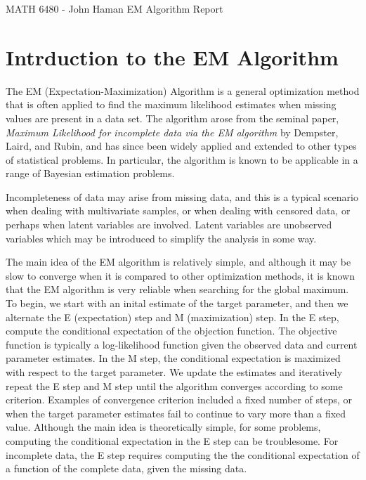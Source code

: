 \documentclass[12pt]{article}
\newcommand{\CourseName}{\textsf{MATH 6480 - John Haman }}
\begin{document}
\medskip
\begin{flushleft}
  \CourseName \hfill \textsf{EM Algorithm Report}\\
\medskip

\section{Intrduction to the EM Algorithm}

\par


The EM (Expectation-Maximization) Algorithm is a general optimization method that is often applied to find the maximum likelihood estimates when missing values are present in a data set. The algorithm arose from the seminal paper, \textit{Maximum Likelihood for incomplete data via the EM algorithm} by Dempster, Laird, and Rubin, and has since been widely applied and extended to other types of statistical problems. In particular, the algorithm is known to be applicable in a range of Bayesian estimation problems. 

\medskip

\par

Incompleteness of data may arise from missing data, and this is a typical scenario when dealing with multivariate samples, or when dealing with censored data, or perhaps when latent variables are involved. Latent variables are unobserved variables which may be introduced to simplify the analysis in some way. \\

\medskip

\par

The main idea of the EM algorithm is relatively simple, and although it may be slow to converge when it is compared to other optimization methods, it is known that the EM algorithm is very reliable when searching for the global maximum. To begin, we start with an inital estimate of the target parameter, and then we alternate the E (expectation) step and M (maximization) step. In the E step, compute the conditional expectation of the objection function. The objective function is typically a log-likelihood function given the observed data and current parameter estimates. In the M step, the conditional expectation is maximized with respect to the target parameter. We update the estimates and iteratively repeat the E step and M step until the algorithm converges according to some criterion. Examples of convergence criterion included a fixed number of steps, or when the target parameter estimates fail to continue to vary more than a fixed value. Although the main idea is theoretically simple, for some problems, computing the conditional expectation in the E step can be troublesome. For incomplete data, the E step requires computing the the conditional expectation of a function of the complete data, given the missing data. 


\end{flushleft}
\end{document}
